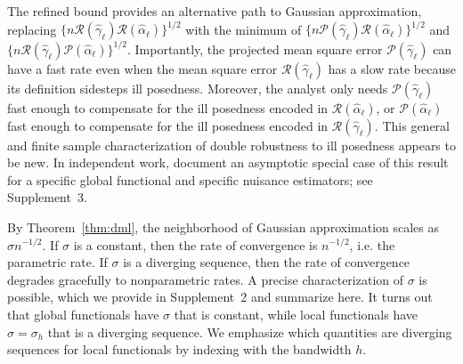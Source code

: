 The refined bound provides an alternative path to Gaussian approximation, replacing $\{n \mathcal{R}(\hat{\gamma}_{\ell}) \mathcal{R}(\hat{\alpha}_{\ell}) \}^{1/2}$ with the minimum of $\{n\mathcal{P}(\hat{\gamma}_{\ell})\mathcal{R}(\hat{\alpha}_{\ell})\}^{1/2}$ and $\{n\mathcal{R}(\hat{\gamma}_{\ell})\mathcal{P}(\hat{\alpha}_{\ell})\}^{1/2}$. Importantly, the projected mean square error $\mathcal{P}(\hat{\gamma}_{\ell})$ can have a fast rate even when the mean square error $\mathcal{R}(\hat{\gamma}_{\ell})$ has a slow rate because its definition sidesteps ill posedness. Moreover, the analyst only needs $\mathcal{P}(\hat{\gamma}_{\ell})$ fast enough to compensate for the ill posedness encoded in $\mathcal{R}(\hat{\alpha}_{\ell})$, or  $\mathcal{P}(\hat{\alpha}_{\ell})$ fast enough to compensate for the ill posedness encoded in $\mathcal{R}(\hat{\gamma}_{\ell})$. This general and finite sample characterization of double robustness to ill posedness appears to be new. In independent work, \cite{kallus2021causal} document an asymptotic special case of this result for a specific global functional and specific nuisance estimators; see Supplement~3.

By Theorem~\ref{thm:dml}, the neighborhood of Gaussian approximation scales as $\sigma n^{-1/2}$. If $\sigma$ is a constant, then the rate of convergence is $n^{-1/2}$, i.e. the parametric rate. If $\sigma$ is a diverging sequence, then the rate of convergence degrades gracefully to nonparametric rates. A precise characterization of $\sigma$ is possible, which we provide in Supplement~2 and summarize here.
It turns out that global functionals have $\sigma$ that is constant, while local functionals have $\sigma=\sigma_h$ that is a diverging sequence. We emphasize which quantities are diverging sequences for local functionals by indexing with the bandwidth $h$.

